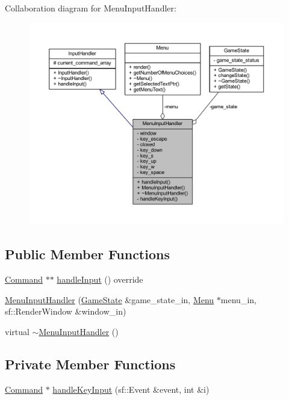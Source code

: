 Collaboration diagram for Menu\+Input\+Handler\+:\nopagebreak
\begin{figure}[H]
\begin{center}
\leavevmode
\includegraphics[width=350pt]{class_menu_input_handler__coll__graph}
\end{center}
\end{figure}
\subsection*{Public Member Functions}
\begin{DoxyCompactItemize}
\item 
\hyperlink{class_command}{Command} $\ast$$\ast$ \hyperlink{class_menu_input_handler_a60840342f557c79f31097aa713ba7a37}{handle\+Input} () override
\item 
\hyperlink{class_menu_input_handler_a244c829acc6ffe44795e44cb2980615b}{Menu\+Input\+Handler} (\hyperlink{class_game_state}{Game\+State} \&game\+\_\+state\+\_\+in, \hyperlink{class_menu}{Menu} $\ast$menu\+\_\+in, sf\+::\+Render\+Window \&window\+\_\+in)
\item 
virtual \hyperlink{class_menu_input_handler_aad61207bccc58ff8c688ffb265ca13db}{$\sim$\+Menu\+Input\+Handler} ()
\end{DoxyCompactItemize}
\subsection*{Private Member Functions}
\begin{DoxyCompactItemize}
\item 
\hyperlink{class_command}{Command} $\ast$ \hyperlink{class_menu_input_handler_aefd1edfd9f0d0770383c4977416de3bf}{handle\+Key\+Input} (sf\+::\+Event \&event, int \&i)
\end{DoxyCompactItemize}
